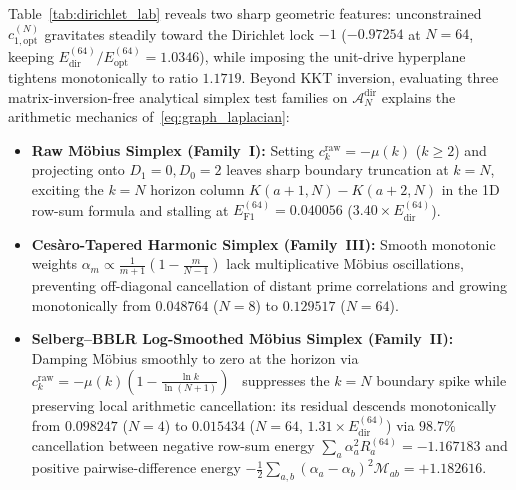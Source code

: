 \documentclass[10pt,a4paper]{article}
\theoremstyle{definition}
\begin{document}
Table~\ref{tab:dirichlet_lab} reveals two sharp geometric features: unconstrained $c_{1,\mathrm{opt}}^{(N)}$ gravitates steadily toward the Dirichlet lock $-1$ ($-0.97254$ at $N=64$, keeping $E_{\mathrm{dir}}^{(64)} / E_{\mathrm{opt}}^{(64)} = 1.0346$), while imposing the unit-drive hyperplane tightens monotonically to ratio $1.1719$. Beyond KKT inversion, evaluating three matrix-inversion-free analytical simplex test families on $\mathcal{A}_N^{\mathrm{dir}}$ explains the arithmetic mechanics of~\eqref{eq:graph_laplacian}:
\begin{itemize}[leftmargin=1.6em,itemsep=2pt]
\item \textbf{Raw M\"obius Simplex (Family~I):} Setting $c_k^{\mathrm{raw}} = -\mu(k)$ ($k \ge 2$) and projecting onto $D_1 = 0, D_0 = 2$ leaves sharp boundary truncation at $k = N$, exciting the $k = N$ horizon column $K(a+1, N) - K(a+2, N)$ in the 1D row-sum formula and stalling at $E_{\mathrm{F1}}^{(64)} = 0.040056$ ($3.40\times E_{\mathrm{dir}}^{(64)}$).
\item \textbf{Ces\`aro-Tapered Harmonic Simplex (Family~III):} Smooth monotonic weights $\alpha_m \propto \tfrac{1}{m+1}(1 - \tfrac{m}{N-1})$ lack multiplicative M\"obius oscillations, preventing off-diagonal cancellation of distant prime correlations and growing monotonically from $0.048764$ ($N=8$) to $0.129517$ ($N=64$).
\item \textbf{Selberg--BBLR Log-Smoothed M\"obius Simplex (Family~II):} Damping M\"obius smoothly to zero at the horizon via $c_k^{\mathrm{raw}} = -\mu(k)(1 - \frac{\ln k}{\ln(N+1)})$~\cite{Selberg1942,BaezDuarteBalazardLandreauSaias2000} suppresses the $k=N$ boundary spike while preserving local arithmetic cancellation: its residual descends monotonically from $0.098247$ ($N=4$) to $0.015434$ ($N=64$, $1.31\times E_{\mathrm{dir}}^{(64)}$) via $98.7\%$ cancellation between negative row-sum energy $\sum_a \alpha_a^2 R_a^{(64)} = -1.167183$ and positive pairwise-difference energy $-\tfrac{1}{2}\sum_{a,b}(\alpha_a - \alpha_b)^2 \mathcal{M}_{ab} = +1.182616$.
\end{itemize}
\end{document}
